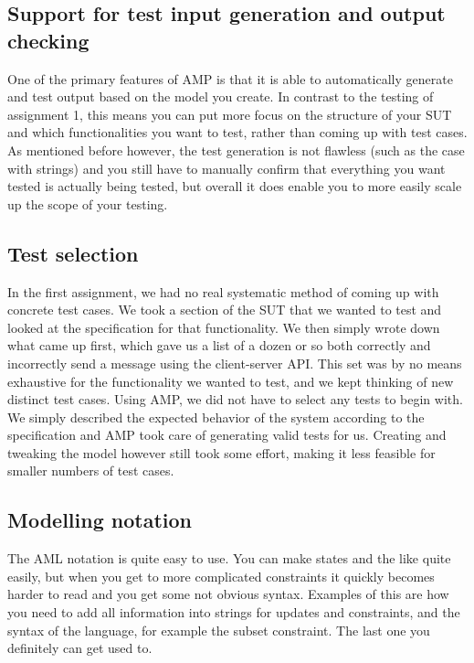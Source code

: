 \documentclass[a4paper]{article}
\begin{document}
\subsection{Support for test input generation and output checking} \label{support-for-test-input-generation-and-output-checking}
One of the primary features of AMP is that it is able to automatically generate and test output based on the model you create. In contrast to the testing of assignment 1, this means you can put more focus on the structure of your SUT and which functionalities you want to test, rather than coming up with test cases. As mentioned before however, the test generation is not flawless (such as the case with strings) and you still have to manually confirm that everything you want tested is actually being tested, but overall it does enable you to more easily scale up the scope of your testing.

\subsection{Test selection} \label{test-selection}
In the first assignment, we had no real systematic method of coming up with concrete test cases. We took a section of the SUT that we wanted to test and looked at the specification for that functionality. We then simply wrote down what came up first, which gave us a list of a dozen or so both correctly and incorrectly send a message using the client-server API. This set was by no means exhaustive for the functionality we wanted to test, and we kept thinking of new distinct test cases. Using AMP, we did not have to select any tests to begin with. We simply described the expected behavior of the system according to the specification and AMP took care of generating valid tests for us. Creating and tweaking the model however still took some effort, making it less feasible for smaller numbers of test cases.

\subsection{Modelling notation} \label{modelling-notation}
The AML notation is quite easy to use. You can make states and the like quite easily, but when you get to more complicated constraints it quickly becomes harder to read and you get some not obvious syntax. Examples of this are how you need to add all information into strings for updates and constraints, and the syntax of the language, for example the subset constraint. The last one you definitely can get used to.
\end{document}
